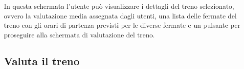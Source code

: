 In questa schermata l'utente può visualizzare i dettagli del treno selezionato, ovvero la valutazione media assegnata dagli utenti, una lista delle fermate del treno con gli orari di partenza previsti per le diverse fermate e un pulsante per proseguire alla schermata di valutazione del treno.

\subsection{Valuta il treno}

\begin{figure}[htp]
    \centering
     \quad
     \quad

\end{figure}
